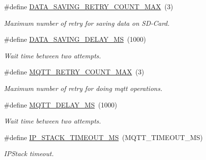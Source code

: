 \begin{DoxyCompactItemize}
\#define \hyperlink{rmap-config_8h_a81ed8eac7c6867ba31602628402f97c1}{D\+A\+T\+A\+\_\+\+S\+A\+V\+I\+N\+G\+\_\+\+R\+E\+T\+R\+Y\+\_\+\+C\+O\+U\+N\+T\+\_\+\+M\+AX}~(3)
\begin{DoxyCompactList}\small\item\em Maximum number of retry for saving data on S\+D-\/\+Card. \end{DoxyCompactList}\item 
\mbox{\label{rmap-config_8h_a511bba65f6e387335efa4c2ca6a9d948}} 
\#define \hyperlink{rmap-config_8h_a511bba65f6e387335efa4c2ca6a9d948}{D\+A\+T\+A\+\_\+\+S\+A\+V\+I\+N\+G\+\_\+\+D\+E\+L\+A\+Y\+\_\+\+MS}~(1000)
\begin{DoxyCompactList}\small\item\em Wait time between two attempts. \end{DoxyCompactList}\item 
\mbox{\label{rmap-config_8h_a823e4d8bca9ba0990f5c085dc997fafb}} 
\#define \hyperlink{rmap-config_8h_a823e4d8bca9ba0990f5c085dc997fafb}{M\+Q\+T\+T\+\_\+\+R\+E\+T\+R\+Y\+\_\+\+C\+O\+U\+N\+T\+\_\+\+M\+AX}~(3)
\begin{DoxyCompactList}\small\item\em Maximum number of retry for doing mqtt operations. \end{DoxyCompactList}\item 
\mbox{\label{rmap-config_8h_a4a9d04eab0c57e3143a6d1be60b73fb3}} 
\#define \hyperlink{rmap-config_8h_a4a9d04eab0c57e3143a6d1be60b73fb3}{M\+Q\+T\+T\+\_\+\+D\+E\+L\+A\+Y\+\_\+\+MS}~(1000)
\begin{DoxyCompactList}\small\item\em Wait time between two attempts. \end{DoxyCompactList}\item 
\mbox{\label{rmap-config_8h_a578ee6f26618a9f795fb5828663431f0}} 
\#define \hyperlink{rmap-config_8h_a578ee6f26618a9f795fb5828663431f0}{I\+P\+\_\+\+S\+T\+A\+C\+K\+\_\+\+T\+I\+M\+E\+O\+U\+T\+\_\+\+MS}~(M\+Q\+T\+T\+\_\+\+T\+I\+M\+E\+O\+U\+T\+\_\+\+MS)
\begin{DoxyCompactList}\small\item\em I\+P\+Stack timeout. \end{DoxyCompactList}\item 
\mbox{\label{rmap-config_8h_a8c44e74b589622bd3a3c69bfdc754a3b}} 

\end{DoxyCompactItemize}

